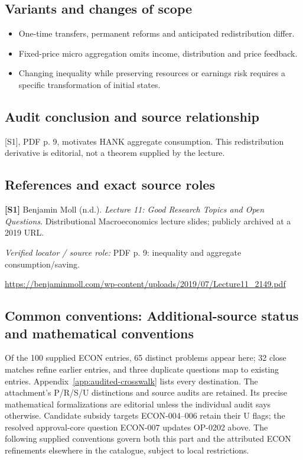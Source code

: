 \documentclass[11pt,a4paper]{article}
\begin{document}
\subsection*{Variants and changes of scope}

\begin{itemize}
\item One-time transfers, permanent reforms and anticipated redistribution differ.
\item Fixed-price micro aggregation omits income, distribution and price feedback.
\item Changing inequality while preserving resources or earnings risk requires a specific transformation of initial states.
\end{itemize}

\subsection*{Audit conclusion and source relationship}

[S1], PDF p. 9, motivates HANK aggregate consumption. This redistribution derivative is editorial, not a theorem supplied by the lecture.

\subsection*{References and exact source roles}

{\footnotesize\raggedright
\par\noindent\textbf{[S1]} Benjamin Moll (n.d.). \emph{Lecture 11: Good Research Topics and Open Questions}. Distributional Macroeconomics lecture slides; publicly archived at a 2019 URL.\par \textit{Verified locator / source role:} PDF p. 9: inequality and aggregate consumption/saving.\par \url{https://benjaminmoll.com/wp-content/uploads/2019/07/Lecture11_2149.pdf}\par\smallskip
}

\subsection*{Common conventions: Additional-source status and mathematical conventions}

\label{audited:conventions}

Of the 100 supplied ECON entries, 65 distinct problems appear here; 32 close
matches refine earlier entries, and three duplicate questions map to existing
entries. Appendix~\ref{app:audited-crosswalk} lists every destination.
The attachment's P/R/S/U distinctions and source audits are retained. Its
precise mathematical formalizations are editorial unless the individual audit
says otherwise. Candidate subsidy targets ECON-004--006 retain their U flags;
the resolved approval-core question ECON-007 updates OP-0202 above.
The following supplied conventions govern both this part and the attributed
ECON refinements elsewhere in the catalogue, subject to local restrictions.
\end{document}
